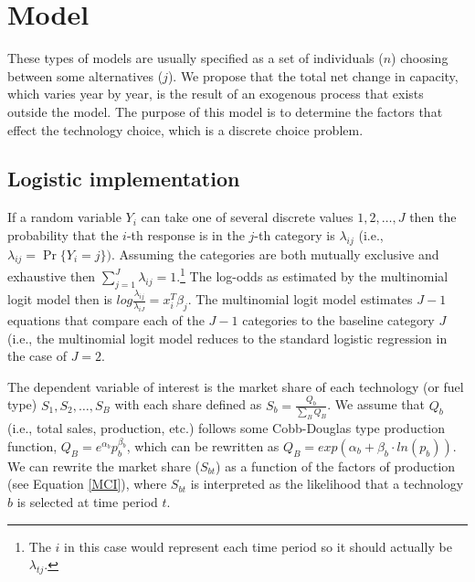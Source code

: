 \documentclass[10pt]{amsart}
\begin{document}
\newpage
{}
\begin{landscape}
\end{landscape}
\restoregeometry

\newpage
\section{Model}
These types of models are usually specified as a set of individuals ($n$) choosing between some alternatives ($j$).
We propose that the total net change in capacity, which varies year by year, is the result of an exogenous process that exists outside the model. 
The purpose of this model is to determine the factors that effect the technology choice, which is a discrete choice problem.

\subsection{Logistic implementation}
If a random variable $Y_{i}$ can take one of several discrete values $1, 2, \ldots, J$ then the probability that the $i$-th response is in the $j$-th category is $\lambda_{ij}$ (i.e., $\lambda_{ij} = \Pr\{Y_{i} = j\})$. 
Assuming the categories are both mutually exclusive and exhaustive then $\sum_{j=1}^J \lambda_{ij} = 1$.\footnote{The $i$ in this case would represent each time period so it should actually be $\lambda_{tj}$.} 
The log-odds as estimated by the multinomial logit model then is $log \frac{\lambda_{ij}}{\lambda_{iJ}} = x_{i}^T \beta_j$.
The multinomial logit model estimates $J - 1$ equations that compare each of the $J - 1$ categories to the baseline category $J$ (i.e., the multinomial logit model reduces to the standard logistic regression in the case of $J=2$. 

The dependent variable of interest is the market share of each technology (or fuel type) \textit{$S_1, S_2, \ldots, S_B$} with each share defined as $S_b = \frac{Q_b}{\sum_B Q_B}$.
We assume that $Q_b$ (i.e., total sales, production, etc.) follows some Cobb-Douglas type production function, $Q_B = e^{\alpha_b}p_{b}^{\beta_b}$, which can be rewritten as $Q_B = exp\left(\alpha_b + \beta_b \cdot ln(p_b)\right)$.
We can rewrite the market share ($S_{bt}$) as a function of the factors of production (see Equation \ref{MCI}), where $S_{bt}$ is interpreted as the likelihood that a technology $b$ is selected at time period $t$.  
\end{document}
